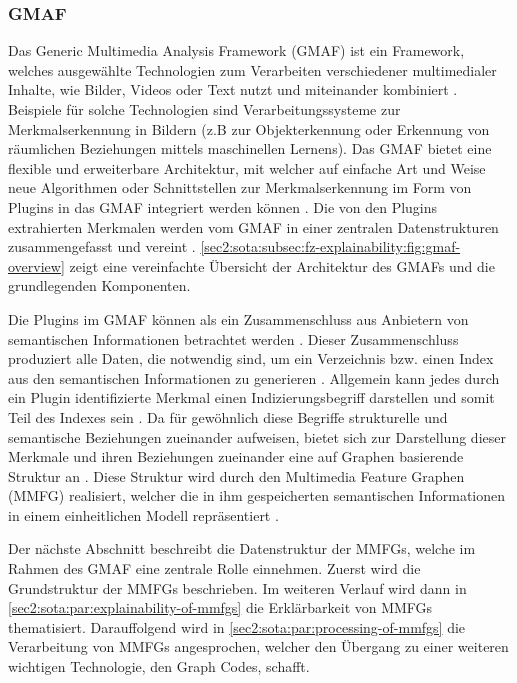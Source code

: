 \subsubsection{GMAF}
\label{sec2:sota:subsubsec:gmaf}
Das Generic Multimedia Analysis Framework (GMAF) \cite{gmaf_github} ist ein Framework, welches ausgewählte Technologien zum Verarbeiten verschiedener multimedialer Inhalte, wie Bilder, Videos oder Text nutzt und miteinander kombiniert \cite{ai-based-sem-ind-retr-soc, exp-mmfg}.
Beispiele für solche Technologien sind Verarbeitungssysteme zur Merkmalserkennung in Bildern (z.B zur Objekterkennung oder Erkennung von räumlichen Beziehungen mittels maschinellen Lernens).
Das GMAF bietet eine flexible und erweiterbare Architektur, mit welcher auf einfache Art und Weise neue Algorithmen oder Schnittstellen zur Merkmalserkennung im Form von Plugins in das GMAF integriert werden können \cite{exp-mmfg}.
Die von den Plugins extrahierten Merkmalen werden vom GMAF in einer zentralen Datenstrukturen zusammengefasst und vereint \cite{ai-based-sem-ind-retr-soc, jour-smmir}. \cref{sec2:sota:subsec:fz-explainability:fig:gmaf-overview} zeigt eine vereinfachte Übersicht der Architektur des GMAFs und die grundlegenden Komponenten.

Die Plugins im GMAF können als ein Zusammenschluss aus Anbietern von semantischen Informationen betrachtet werden \cite{ai-based-sem-ind-retr-soc}.
Dieser Zusammenschluss produziert alle Daten, die notwendig sind, um ein Verzeichnis bzw. einen Index aus den semantischen Informationen zu generieren \cite{ai-based-sem-ind-retr-soc}.
Allgemein kann jedes durch ein Plugin identifizierte Merkmal einen Indizierungsbegriff darstellen und somit Teil des Indexes sein \cite{fast-effec-retr-large-collec}.
Da für gewöhnlich diese Begriffe strukturelle und semantische Beziehungen zueinander aufweisen, bietet sich zur Darstellung dieser Merkmale und ihren Beziehungen zueinander eine auf Graphen basierende Struktur an \cite{fast-effec-retr-large-collec}.
Diese Struktur wird durch den Multimedia Feature Graphen (MMFG) realisiert, welcher die in ihm gespeicherten semantischen Informationen in einem einheitlichen Modell repräsentiert \cite{fast-effec-retr-large-collec}.

Der nächste Abschnitt beschreibt die Datenstruktur der MMFGs, welche im Rahmen des GMAF eine zentrale Rolle einnehmen.
Zuerst wird die Grundstruktur der MMFGs beschrieben.
Im weiteren Verlauf wird dann in \cref{sec2:sota:par:explainability-of-mmfgs} die Erklärbarkeit von MMFGs thematisiert.
Darauffolgend wird in \cref{sec2:sota:par:processing-of-mmfgs} die Verarbeitung von MMFGs angesprochen, welcher den Übergang zu einer weiteren wichtigen Technologie, den Graph Codes, schafft.

